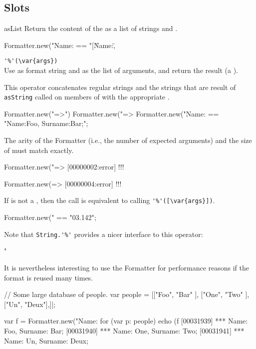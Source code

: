 \subsection{Slots}

\begin{urbiscriptapi}
\item[asList]
  Return the content of the  as a list of strings and
  .
\begin{urbiassert}
Formatter.new("Name:%
       == "[\"Name:\", %
\end{urbiassert}

\item \lstinline|'%'(\var{args})|\\
  Use \this as format string and  as the list of arguments, and
  return the result (a ).

  This operator concatenates regular strings and the strings that are result
  of \lstinline|asString| called on members of  with the
  appropriate .
\begin{urbiassert}
Formatter.new("=>") %
Formatter.new("=> %
Formatter.new("Name:%
       == "Name:Foo, Surname:Bar;";
\end{urbiassert}

The arity of the Formatter (i.e., the number of expected arguments) and the
size of  must match exactly.

\begin{urbiassert}
Formatter.new("=> %
[00000002:error] !!! %

Formatter.new(=> %
[00000004:error] !!! %
\end{urbiassert}

  If  is not a , then the call is equivalent
  to calling \lstinline|'%'([\var{args}])|.
\begin{urbiassert}
Formatter.new("%
       == "03.142";
\end{urbiassert}

  Note that \lstinline|String.'%'| provides a nicer interface to this
  operator:
\begin{urbiassert}
"%
\end{urbiassert}

  It is nevertheless interesting to use the Formatter for performance
  reasons if the format is reused many times.
\begin{urbiscript}
// Some large database of people.
var people =
  [["Foo", "Bar" ],
   ["One", "Two" ],
   ["Un",  "Deux"],]|;

var f = Formatter.new("Name:%
for (var p: people)
  echo (f %
[00031939] *** Name:    Foo, Surname:    Bar;
[00031940] *** Name:    One, Surname:    Two;
[00031941] *** Name:     Un, Surname:   Deux;
\end{urbiscript}
\end{urbiscriptapi}

